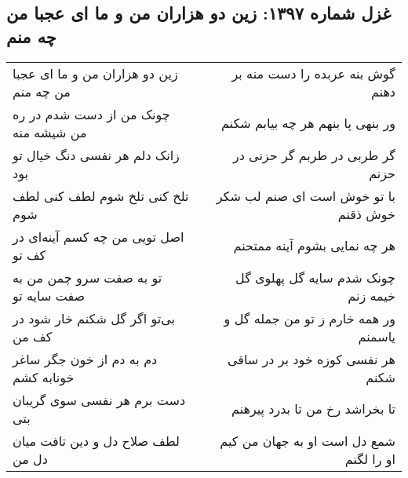 \begin{center}
\section*{غزل شماره ۱۳۹۷: زین دو هزاران من و ما ای عجبا من چه منم}
\label{sec:1397}
\begin{longtable}{l p{0.5cm} r}
زین دو هزاران من و ما ای عجبا من چه منم
&&
گوش بنه عربده را دست منه بر دهنم
\\
چونک من از دست شدم در ره من شیشه منه
&&
ور بنهی پا بنهم هر چه بیابم شکنم
\\
زانک دلم هر نفسی دنگ خیال تو بود
&&
گر طربی در طربم گر حزنی در حزنم
\\
تلخ کنی تلخ شوم لطف کنی لطف شوم
&&
با تو خوش است ای صنم لب شکر خوش ذقنم
\\
اصل تویی من چه کسم آینه‌ای در کف تو
&&
هر چه نمایی بشوم آینه ممتحنم
\\
تو به صفت سرو چمن من به صفت سایه تو
&&
چونک شدم سایه گل پهلوی گل خیمه زنم
\\
بی‌تو اگر گل شکنم خار شود در کف من
&&
ور همه خارم ز تو من جمله گل و یاسمنم
\\
دم به دم از خون جگر ساغر خونابه کشم
&&
هر نفسی کوزه خود بر در ساقی شکنم
\\
دست برم هر نفسی سوی گریبان بتی
&&
تا بخراشد رخ من تا بدرد پیرهنم
\\
لطف صلاح دل و دین تافت میان دل من
&&
شمع دل است او به جهان من کیم او را لگنم
\\
\end{longtable}
\end{center}
